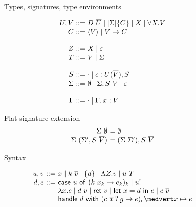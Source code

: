 \documentclass[preprint]{sigplanconf}
\makeatletter
\newcommand{\set}[1]{\{#1\}}
\newcommand{\many}{\overline}
\newcommand{\seml}{\left\llbracket}
\newcommand{\semr}{\right\rrbracket}
\newcommand{\FV}{\mathit{FV}}
\newcommand{\dom}{\mathit{dom}}
\newcommand\ba{\begin{array}}
\newcommand\ea{\end{array}}
\newcommand{\bl}{\ba{@{}c@{}}}
\newcommand{\el}{\ea}
\newcommand{\val}[3]  {#1 \vdash {#2} : {#3}}
\newcommand{\rt}[1]{\langle{#1}\rangle}   %
\newcommand{\sig}{S}
\newcommand{\sigs}{\Sigma}
\newcommand{\effbox}[1]{[#1]}
\newcommand{\key}[1]{\mathsf{#1}}
\newcommand{\handleSymbol}{\mathbin{?}}
\newcommand{\handle}[2]{{#1} \handleSymbol {#2}}
\newcommand{\thunk}[1]{\{{#1}\}}
\newcommand{\force}[1]{{#1}!}
\makeatother
\begin{document}

\begin{figure*}

Types, signatures, type environments

\[
\begin{array}{@{}r@{~}l@{}}
U, V &::= D~\many{U} \mid \effbox{\sigs}\thunk{C} \mid X \mid \forall X.V \\
C    &::= \rt{V} \mid V \to C \\  %
\\
Z    &::= X \mid \varepsilon \\
T    &::= V \mid \sigs \\
\\
\sig  &::= \cdot \mid c : U(\many{V}), \sig \\
\sigs &::=
  \emptyset \mid \sigs, \sig~\many{V} \mid \varepsilon \\
\\
\Gamma &::= \cdot \mid \Gamma, x:V \\
\end{array}
\]

Flat signature extension
\[
\begin{array}{@{}r@{~}l@{}}
\sigs~\emptyset &= \emptyset \\
\sigs~(\sigs', \sig~\many{V}) &= (\sigs~\sigs'), \sig~\many{V} \\
\end{array}
\]

Syntax

\[
\begin{array}{@{}r@{~}c@{~}l@{}}
u, v &::=& x \mid k~\many{v} \mid \thunk{d}
             \mid \Lambda Z.v \mid u~T \\
d, e &::=& \key{case}~u~\key{of}~
             (k~\many{x_k} \mapsto e_k)_k
     \mid \force{u} \\
     &\mid& \lambda x.e \mid d~v 
      \mid \key{ret}~v \mid \key{let}~x=d~\key{in}~e
      \mid c~\many{v} \\
     &\mid& \key{handle} ~d~ \key{with}~
               (\handle{c~\many{x}}{g} \mapsto e)_c \medvert
               x        \mapsto e \\
\end{array}
\]


\end{figure*}
\end{document}
